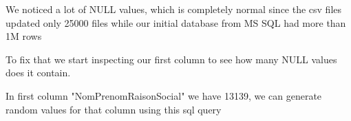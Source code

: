 We noticed a lot of NULL values, which is completely normal since the csv files updated only 25000 files while our initial database from MS SQL had more than 1M rows 
\begin{figure}[H]
\centering
{}
\end{figure}
\begin{figure}[H]
\centering
{}
\end{figure}

To fix that we start inspecting our first column to see how many NULL values does it contain. 
\begin{figure}[H]
\centering
{}
\end{figure}


In first column "NomPrenomRaisonSocial" we have 13139, we can generate random values for that column using this sql query 
\begin{figure}[H]
\centering
{}
\end{figure}


